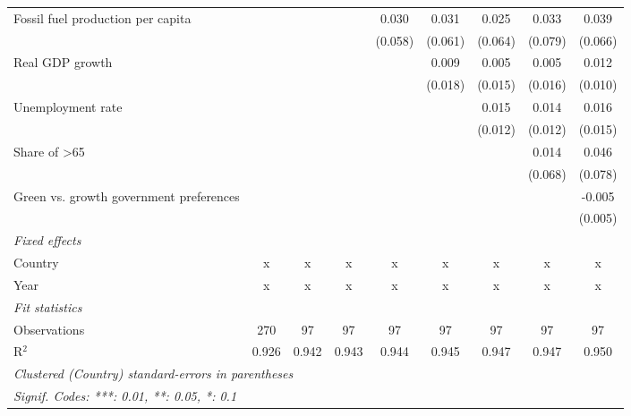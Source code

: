 \begin{table}[htbp]
\begin{tabular}{lcccccccc}
      Fossil fuel production per capita       &                &               &              & 0.030        & 0.031   & 0.025   & 0.033   & 0.039\\   
                                              &                &               &              & (0.058)      & (0.061) & (0.064) & (0.079) & (0.066)\\   
      Real GDP growth                         &                &               &              &              & 0.009   & 0.005   & 0.005   & 0.012\\   
                                              &                &               &              &              & (0.018) & (0.015) & (0.016) & (0.010)\\   
      Unemployment rate                       &                &               &              &              &         & 0.015   & 0.014   & 0.016\\   
                                              &                &               &              &              &         & (0.012) & (0.012) & (0.015)\\   
      Share of >65                            &                &               &              &              &         &         & 0.014   & 0.046\\   
                                              &                &               &              &              &         &         & (0.068) & (0.078)\\   
      Green vs. growth government preferences &                &               &              &              &         &         &         & -0.005\\   
                                              &                &               &              &              &         &         &         & (0.005)\\   
      \emph{Fixed effects}\\
      Country                                 & x              & x             & x            & x            & x       & x       & x       & x\\  
      Year                                    & x              & x             & x            & x            & x       & x       & x       & x\\  
      \midrule \emph{Fit statistics}\\
      Observations                            & 270            & 97            & 97           & 97           & 97      & 97      & 97      & 97\\  
      R$^2$                                   & 0.926          & 0.942         & 0.943        & 0.944        & 0.945   & 0.947   & 0.947   & 0.950\\  
      \midrule
      \multicolumn{9}{l}{\emph{Clustered (Country) standard-errors in parentheses}}\\
      \multicolumn{9}{l}{\emph{Signif. Codes: ***: 0.01, **: 0.05, *: 0.1}}\\
   \end{tabular}
\end{table}


